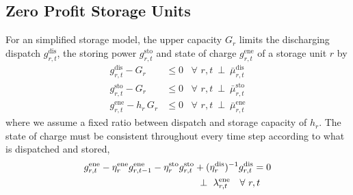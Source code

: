 \documentclass[11pt,twocolumn]{article}
\newcommand{\resultsin}[1]{\hspace{6pt} \bot  \hspace{6pt} #1}
\newcommand{\Forall}[1]{\hspace{10pt} \forall \,\, #1 }
\newcommand{\pdv}[2]{\frac{\partial #1}{\partial #2}}
\newcommand{\storage}{g_{r,t}}
\newcommand{\storagedispatch}{\storage^\text{dis}}
\newcommand{\storagecharge}{\storage^\text{sto}}
\newcommand{\storagesoc}{\storage^\text{ene}}
\newcommand{\storageprevioussoc}{g_{r,t-1}^\text{ene}}
\newcommand{\efficiency}{\eta_{r}}
\newcommand{\efficiencydispatch}{\efficiency^\text{dis}}
\newcommand{\efficiencycharge}{\efficiency^\text{sto}}
\newcommand{\efficiencysoc}{\efficiency^\text{ene}}
\newcommand{\capitalpricestorage}{c_r}
\newcommand{\capacitystorage}{G_r}
\newcommand{\muupperstoragedispatch}{\bar{\mu}_{r,t}^\text{dis}}
\newcommand{\muupperstoragecharge}{\bar{\mu}_{r,t}^\text{sto}}
\newcommand{\muupperstoragesoc}{\bar{\mu}_{r,t}^\text{ene}}
\newcommand{\mustateofcharge}{\lambda^\text{ene}_{r,t}}
\newcommand{\lagrangian}{\mathcal{L}}
\begin{document}
\subsection{Zero Profit Storage Units}
\label{sec:zero_profit_storage_units}

For an simplified storage model, the upper capacity $\capacitystorage$ limits the discharging dispatch $\storagedispatch$, the storing power $\storagecharge$ and state of charge $\storagesoc$ of a storage unit $r$ by 
\begin{align}
    \storagedispatch - \capacitystorage &\le 0 \Forall{r,t} \resultsin{\muupperstoragedispatch} \\
    \storagecharge - \capacitystorage &\le 0 \Forall{r,t} \resultsin{\muupperstoragecharge} \\
    \storagesoc - h_r \, \capacitystorage &\le 0 \Forall{r,t} \resultsin{\muupperstoragesoc}
\end{align}
where we assume a fixed ratio between dispatch and storage capacity of $h_r$. 
The state of charge must be consistent throughout every time step according to what is dispatched and stored, 
\begin{align}
    \notag
    \storagesoc - \efficiencysoc \storageprevioussoc - \efficiencycharge \storagecharge &+ (\efficiencydispatch)^{-1} \storagedispatch = 0 \\
    &\resultsin{\mustateofcharge} \Forall{r,t}
\end{align}
\end{document}
